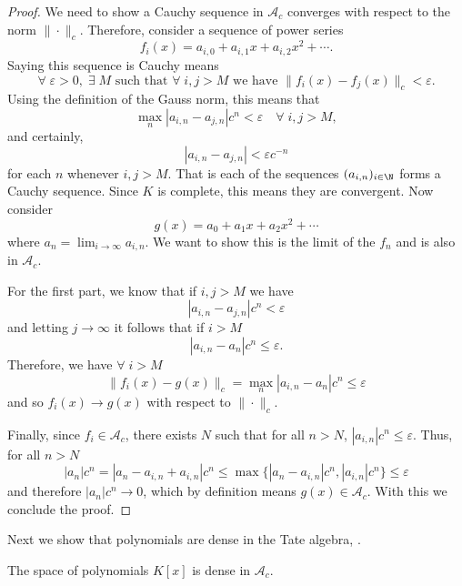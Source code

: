 \begin{proof}
    We need to show a Cauchy sequence in $\mathcal{A}_c$ converges with respect to the norm
    $\|\cdot\|_c$. Therefore, consider a sequence of power series
    \[
    f_i(x) = a_{i,0} + a_{i,1}x + a_{i,2}x^2 + \cdots.
    \]
    Saying this sequence is Cauchy means
    \[
    \forall \; \varepsilon>0, \; \exists \; M \text{ such that } \forall \; i,j > M
    \text{ we have } \|f_i (x) - f_j (x) \|_c < \varepsilon.
    \]
    Using the definition of the Gauss norm, this means that
    \[
    \max_{n} |a_{i,n}-a_{j,n} | c^n < \varepsilon \quad \forall \; i,j > M,
    \]
    and certainly,
    \[
    |a_{i,n} - a_{j,n}| < \varepsilon c^{-n}
    \]
    for each $n$ whenever $i,j > M.$ That is each of the sequences $(a_{i,n})_{i \in \N}$ forms a
    Cauchy sequence. Since $K$ is complete, this means they are convergent.
    Now consider
    \[
    g(x) = a_0 + a_1 x + a_2 x^2 + \cdots
    \]
    where $a_n = \lim_{i \to \infty} a_{i,n}$. We want to show this is the limit of the $f_n$ and
    is also in $\mathcal{A}_c$.

    For the first part, we know that if $i,j > M$ we have
    \[
    |a_{i,n} - a_{j,n} | c^n < \varepsilon
    \]
    and letting $j \to \infty$ it follows that if $i > M$
    \[
    | a_{i,n} - a_n| c^n \leq \varepsilon.
    \]
    Therefore, we have $\forall \; i > M$
    \[
    \| f_i (x) - g(x) \|_c = \max_n |a_{i,n} - a_n| c^n \leq \varepsilon
    \]
    and so $f_i(x) \to g(x)$ with respect to $\| \cdot \|_c.$

    Finally, since $f_ i \in \mathcal{A}_c$, there exists $N$ such that for all
    $n > N$, $|a_{i,n} | c^n \leq \varepsilon.$ Thus, for all $n > N$
    \[
    | a_n |c^n = | a_n - a_{i,n} + a_{i,n}|c^n  \leq \max \{|a_n - a_{i,n}|c^n,|a_{i,n}|c^n\} \leq \varepsilon
    \]
    and therefore $|a_n|c^n \to 0$, which by definition means $g(x) \in \mathcal{A}_c$.
    With this we conclude the proof.
\end{proof}

Next we show that polynomials are dense in the Tate algebra, \cite[Lemma~7.2.8]{Gouvea}.
\begin{lemma}\label{PolyDense}
    The space of polynomials $K[x]$ is dense in $\mathcal{A}_c$.
\end{lemma}

